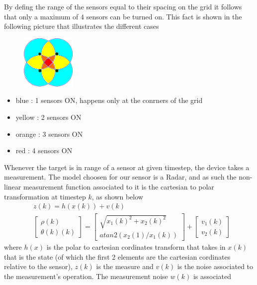\documentclass[twocolumn]{article}
\begin{document}
    By defing the range of the sensors equal to their spacing on the grid it follows that only a maximum of 4 sensors can be turned on. 
    This fact is shown in the following picture that illustrates the different cases
    \begin{figure}[h!]
        \centering
        \includegraphics[width=0.23\textwidth]{Immagini/4sensor.png}
        \caption{}
        \label{fig:number}
    \end{figure}
    \begin{itemize}
        \item blue : 1 sensors ON, happens only at the conrners of the grid
        \item yellow : 2 sensors ON 
        \item orange : 3 sensors ON 
        \item red : 4 sensors ON 
    \end{itemize}
    Whenever the target is in range of a sensor at given timestep, the device takes a measurement.
    The model choosen for our sensor is a Radar, and as such the non-linear measurement function
     associated to it is the cartesian to polar transformation at timestep $k$, as shown below
    \begin{align*}
        &z(k)=h(x(k))+v(k)\\
        &\begin{bmatrix}
            \rho(k)\\ \theta (k)(k)
        \end{bmatrix}=  
        \begin{bmatrix}
            \sqrt{x_{1}(k)^2+x_{2}(k)^2}\\ atan2(x_{2}(1)/x_{1}(k))
        \end{bmatrix} +
        \begin{bmatrix}
            v_{1}(k)\\v_{2}(k)
        \end{bmatrix}
    \end{align*}
    where $h(x)$ is the polar to cartesian cordinates transform that takes in $x(k)$ that is the state (of which the first 2 elements are the cartesian
    cordinates relative to the sensor), $z(k)$ is the measure and $v(k)$ is the noise associated to the measurement's operation. The measurement noise $w(k)$ is associated 
\end{document}
